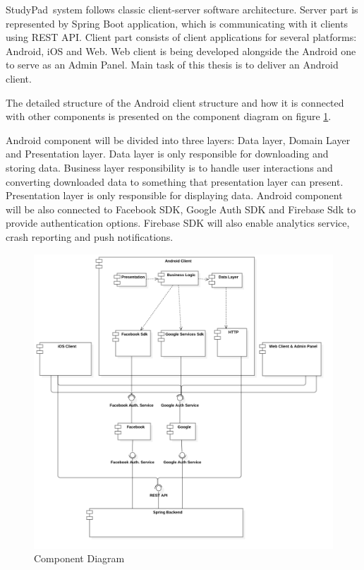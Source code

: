 \documentclass[thesis=B,english]{FITthesis}[2012/10/20]
\newcommand{\appname}{StudyPad}
\begin{document}
\appname\ system follows classic client-server software architecture. Server part is represented by Spring Boot application, which is communicating with it clients using REST API. Client part consists of client applications for several platforms: Android, iOS and Web. Web client is being developed alongside the Android one to serve as an Admin Panel. Main task of this thesis is to deliver an Android client.

The detailed structure of the Android client structure and how it is connected with other components is presented on the component diagram on figure \ref{fig:deploy}. 

 Android component will be divided into three layers: Data layer, Domain Layer and Presentation layer. Data layer is only responsible for downloading and storing data. Business layer responsibility is to handle user interactions and converting downloaded data to something that presentation layer can present. Presentation layer is only responsible for displaying data. Android component will be also connected to Facebook SDK, Google Auth SDK and Firebase Sdk to provide authentication options. Firebase SDK will also enable analytics service, crash reporting and push notifications.
\newpage
\begin{figure}[H]
  \includegraphics[scale=0.4]{deployment}
  \caption{Component Diagram}
  \label{fig:deploy}
\end{figure}
\end{document}
